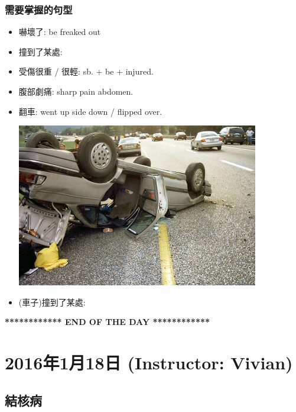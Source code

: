 \subsubsection*{需要掌握的句型}
\begin{itemize}
  \itemsep0em
  \item 嚇壞了: be freaked out
  \item 撞到了某處: 
  \item 受傷很重 / 很輕: sb. + be +  injured.
  \item 腹部劇痛: sharp pain  abdomen.
  \item 翻車: went up side down / flipped over.
  \begin{center}
    \includegraphics[scale=1.8]{pics/flip-over}
  \end{center}
  \item (車子)撞到了某處: 
\end{itemize}

\vspace{15mm}

\begin{center}
  \textbf{************ END OF THE DAY ************}
\end{center}

\newpage

\section{2016年1月18日 (Instructor: Vivian)}
\subsection{結核病}
